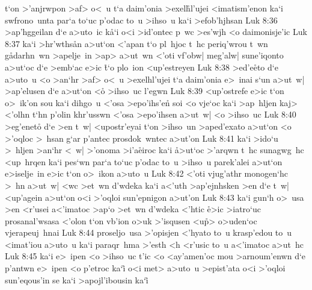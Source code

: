 t`on
>'anjrwpon
>af>
o<~u
t`a
daim'onia
>exel\r{h}l'ujei
<imatism'enon
ka`i
swfrono~unta
par`a
to`uc
p'odac
to~u
>ihso~u
ka`i
>efob'hjhsan\bibvsend
\vs Luk 8:36
>ap'hggeilan
d`e
a>uto~ic
k\r{a}`i
o<i
>id'ontec
p~wc
>es'wjh
<o
daimonisje'ic\bibvsend
\vs Luk 8:37
ka`i
>hr'wths\r{a}n
a>ut`on
<'apan
t`o
pl~hjoc
t~hc
periq'wrou
t~wn
g\r{a}darhn~wn
>apelje~in
>ap>
a>ut~wn
<'oti
vf'obw|
meg'alw|
sune'iqonto
a>ut`oc
d`e
>emb`ac
e>ic
\r{t}`o
plo~ion
<up'estreyen\bibvsend
\vs Luk 8:38
>ed'e\r{e}to
d`e
a>uto~u
<o
>an`hr
>af>
o<~u
>exelhl'ujei
t`a
daim'onia
e>~inai
s`un
a>ut~w|
>ap'elusen
d`e
a>ut`on
<o\r{}
>ihso~uc
l'egwn\bibvsend
\vs Luk 8:39
<up'ostrefe
e>ic
t`on
o>~ik'on
sou
ka`i
dihgo~u
<'osa
>epo'ihs'en\r{}
soi
<o
vje`oc
ka`i
>ap~hljen
kaj>
<'olhn
t`hn
p'olin
khr'usswn
<'osa
>epo'ihsen
a>ut~w|
<o
>ihso~uc\bibvsend
\vs Luk 8:40
>eg'eneto\r{}
d`e
>en
t~w|
<upostr'eyai
t`on
>ihso~un
>aped'exato
a>ut`on
<o
>'oqloc
>~hsan
g`ar
p'antec
prosdok~wntec
a>ut'on\bibvsend
\vs Luk 8:41
ka`i
>ido`u
>~hljen
>an`hr
<~w|
>'onoma
>i'a\r{e}iroc
ka`i
\r{a}>ut`oc
>'arqwn
t~hc
sunagwg~hc
<up~hrqen
ka`i
pes`wn
par`a
to`uc
p'odac
to~u
>ihso~u
parek'alei
a>ut`on
e>iselje~in
e>ic
t`on
o>~ikon
a>uto~u\bibvsend
\vs Luk 8:42
<'oti
vjug'athr
monogen`hc
>~hn
a>ut~w|
<wc
>et~wn
d'wdeka
ka`i
a<'uth
>ap'ejnhsken
>en
d`e
t~w|
<up'agein
a>ut`on
o<i
>'oqloi
sun'epnigon
a>ut'on\bibvsend
\vs Luk 8:43
ka`i
gun`h
o>~usa
>en
<r'usei
a<'imatoc
>ap`o
>et~wn
d'wdeka
<'htic
\r{e}>ic
>iatro`uc
prosanal'wsasa
<'olon
t`on
vb'ion
o>uk
>'isqusen
<u\r{p}>
o>uden`oc
vjerapeuj~hnai\bibvsend
\vs Luk 8:44
proseljo~usa
>'opisjen
<'hyato
to~u
krasp'edou
to~u
<imat'iou
a>uto~u
ka`i
paraqr~hma
>'esth
<h
<r'usic
to~u
a<'imatoc
a>ut~hc\bibvsend
\vs Luk 8:45
ka`i
e>~ipen
<o
>ihso~uc
t'ic
<o
<ay'amen'oc
mou
>arnoum'enwn
d`e
p'antwn
e>~ipen
<o
p'etroc
ka`i\r{}
o<i
met>
a>uto~u
>epist'ata
o<i
>'oqloi
sun'eqous'in
se
ka`i
>apojl'ibousin
ka`i\r{}
